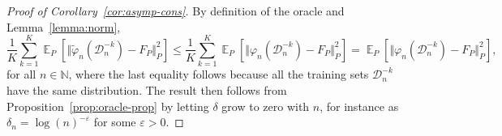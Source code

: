 \documentclass[alpha-refs]{wiley-article}
\DeclareMathOperator{\E}{\mathbb{E}} %
\newcommand{\N}{\mathbb{N}}
\renewcommand{\phi}{\varphi}
\renewcommand{\epsilon}{\varepsilon}
\newcommand{\1}{\mathbb{1}}
\newcommand{\data}{\ensuremath{\mathcal{D}}}
\begin{document}
\begin{proof}[Proof of Corollary~\ref{cor:asymp-cons}]
  By definition of the oracle and Lemma~\ref{lemma:norm},
  \begin{equation*}
    \frac{1}{K} \sum_{k=1}^{K} \E_{P}{\left[ \Vert \tilde{\phi}_n(\data_n^{-k}) - F_P \Vert_{P}^2
      \right]} \leq
    \frac{1}{K} \sum_{k=1}^{K}\E_{P}{\left[ \Vert
        \phi_n(\data_n^{-k}) - F_P \Vert_{P}^2
      \right]}
    =
    \E_{P}{\left[ \Vert \phi_n(\data_n^{-k}) - F_P \Vert_{P}^2
      \right]},
  \end{equation*}
  for all \( n \in \N \), where the last equality follows because all
  the training sets \( \data_n^{-k} \) have the same distribution. The
  result then follows from Proposition~\ref{prop:oracle-prop} by
  letting $\delta$ grow to zero with \( n \), for instance as
  $\delta_n = \log(n)^{-\epsilon}$ for some $\epsilon>0$.
\end{proof}





\end{document}
